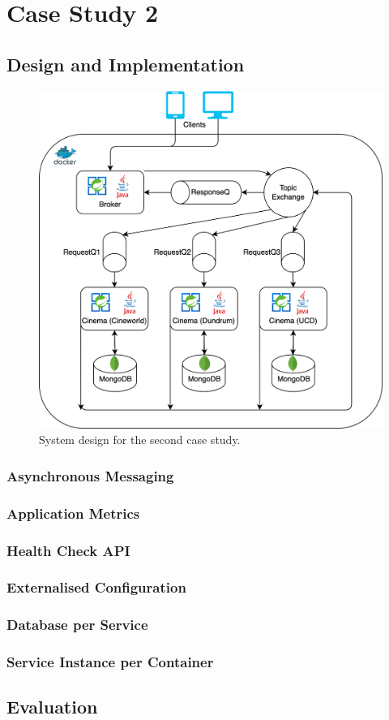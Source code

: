\section{Case Study 2}



\subsection{Design and Implementation}

\begin{figure}[H]
  \centering
  \includegraphics[width=0.6\linewidth]{./assets/diagrams/cs02-arch.png}
  \caption{System design for the second case study.}
  \label{fig:cs02-arch}
\end{figure}

\subsubsection{Asynchronous Messaging}
\subsubsection{Application Metrics}
\subsubsection{Health Check API}
\subsubsection{Externalised Configuration}
\subsubsection{Database per Service}
\subsubsection{Service Instance per Container}

\subsection{Evaluation}
